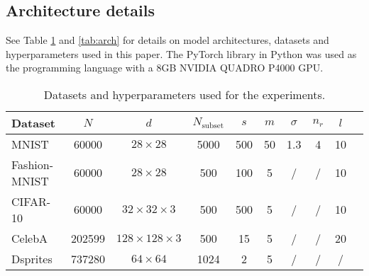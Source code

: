 \documentclass[preview,border=0.3pt]{standalone}
\begin{document}
\subsection{Architecture details}
\label{subsec: Architecture}
%
See Table \ref{Table:dataset} and \ref{tab:arch} for details on model architectures, datasets and hyperparameters used in this paper. The PyTorch library in Python was used as the programming language with a 8GB NVIDIA QUADRO P4000 GPU.
%
\begin{table}[H]
    \caption{Datasets and hyperparameters used for the experiments.}
    \label{Table:dataset}
    \centering
    \begin{tabular}{lccccccccc}
        \toprule
        Dataset       & $N$    & $d$                       & $N_{\mathrm{subset}}$ & $s$ & $m$ & $\sigma$ & $n_r$ & $l$ \\ \midrule
        MNIST         & 60000  & $28 \times 28$            & 5000                  & 500 & 50  & 1.3      & 4     & 10  \\
        Fashion-MNIST & 60000  & $28 \times 28$            & 500                   & 100 & 5   & /        & /     & 10  \\
        CIFAR-10      & 60000  & $32 \times 32 \times 3$   & 500                   & 500 & 5   & /        & /     & 10  \\
        CelebA        & 202599 & $128 \times 128 \times 3$ & 500                   & 15  & 5   & /        & /     & 20  \\
        Dsprites      & 737280 & $64 \times 64$            & 1024                  & 2   & 5   & /        & /     & /   \\ \bottomrule
    \end{tabular}
\end{table}
%
%
\end{document}
